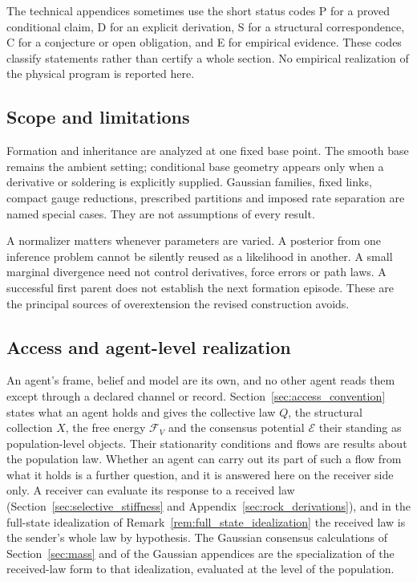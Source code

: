 The technical appendices sometimes use the short status codes P for a proved conditional claim, D for an explicit derivation, S for a structural correspondence, C for a conjecture or open obligation, and E for empirical evidence. These codes classify statements rather than certify a whole section. No empirical realization of the physical program is reported here.

\subsection{Scope and limitations}\label{sec:scope_limitations}
Formation and inheritance are analyzed at one fixed base point. The smooth base remains the ambient setting; conditional base geometry appears only when a derivative or soldering is explicitly supplied. Gaussian families, fixed links, compact gauge reductions, prescribed partitions and imposed rate separation are named special cases. They are not assumptions of every result.

A normalizer matters whenever parameters are varied. A posterior from one inference problem cannot be silently reused as a likelihood in another. A small marginal divergence need not control derivatives, force errors or path laws. A successful first parent does not establish the next formation episode. These are the principal sources of overextension the revised construction avoids.

\subsection{Access and agent-level realization}\label{sec:access_obligations}
An agent's frame, belief and model are its own, and no other agent reads them except through a declared channel or record. Section~\ref{sec:access_convention} states what an agent holds and gives the collective law $Q$, the structural collection $X$, the free energy $\mathcal F_V$ and the consensus potential $\mathcal E$ their standing as population-level objects. Their stationarity conditions and flows are results about the population law. Whether an agent can carry out its part of such a flow from what it holds is a further question, and it is answered here on the receiver side only. A receiver can evaluate its response to a received law (Section~\ref{sec:selective_stiffness} and Appendix~\ref{sec:rock_derivations}), and in the full-state idealization of Remark~\ref{rem:full_state_idealization} the received law is the sender's whole law by hypothesis. The Gaussian consensus calculations of Section~\ref{sec:mass} and of the Gaussian appendices are the specialization of the received-law form to that idealization, evaluated at the level of the population.

